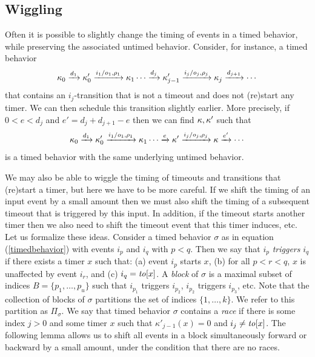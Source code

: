 \subsection{Wiggling}
Often it is possible to slightly change the timing of events in a timed behavior, 
while preserving the associated untimed behavior.
\iflong
Consider, for instance, a timed behavior 
\[
\kappa_0 \xrightarrow{d_1} \kappa'_0 \xrightarrow{i_1/o_1, \rho_1} \kappa_1 \cdots
\xrightarrow{d_j} \kappa'_{j-1} \xrightarrow{i_j/o_j, \rho_j} \kappa_j  \xrightarrow{d_{j+1}} \cdots
\]
that contains an $i_j$-transition that is not a timeout and does not (re)start any timer.
We can then schedule this transition slightly earlier.
More precisely, if $0 < e < d_j$ and $e' = d_j + d_{j+1}- e $ then we can find $\kappa, \kappa'$ such that
\[
\kappa_0 \xrightarrow{d_1} \kappa'_0 \xrightarrow{i_1/o_1, \rho_1} \kappa_1 \cdots
\xrightarrow{e} \kappa' \xrightarrow{i_j/o_j, \rho_j} \kappa  \xrightarrow{e'} \cdots
\]
is a timed behavior with the same underlying untimed behavior.

We may also be able to wiggle the timing of timeouts and transitions that (re)start a timer,
but here we have to be more careful.
\fi
If we shift the timing of an input event by a small amount then we must also shift the timing of a subsequent timeout
that is triggered by this input.
In addition, if the timeout starts another timer then we also need to shift the timeout event that this timer induces, etc.
%
Let us formalize these ideas. Consider a timed behavior $\sigma$ as in equation (\ref{timedbehavior})
with events $i_p$ and $i_q$ with $p < q$.
Then we say that $i_p$ \emph{triggers} $i_q$ if there exists a timer $x$ such that:
(a) event $i_p$ starts $x$, 
(b) for all $p < r < q$, $x$ is unaffected by event $i_r$, and
(c) $i_q = \mathit{to}[x]$.
A \emph{block} of $\sigma$ is a maximal subset of indices $B = \{ p_1 ,\ldots, p_u \}$ such that $i_{p_1}$ triggers $i_{p_2}$, $i_{p_2}$ triggers $i_{p_3}$, etc.
Note that the collection of blocks of $\sigma$ partitions the set of indices $\{ 1 ,\ldots, k \}$.
We refer to this partition as $\Pi_{\sigma}$.
We say that timed behavior $\sigma$ contains a \emph{race} if there is some index $j>0$ and some timer $x$  
such that $\kappa'_{j-1}(x) = 0$ and $i_j \neq \mathit{to}[x]$.
The following lemma allows us to shift all events in a block simultaneously forward or backward by a small amount, 
under the condition that there are no races.

